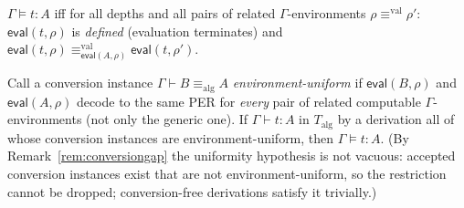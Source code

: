 \documentclass{lmcs}
\newcommand{\aconv}{\equiv_{\mathrm{alg}}}
\newcommand{\valeq}{\equiv^{\mathrm{val}}}
\newcommand{\evalop}{\mathsf{eval}}
\begin{document}
\begin{defi}\label{def:semtyping}
  $\Gamma \vDash t : A$ iff for all depths and all pairs of related
  $\Gamma$-environments $\rho \valeq \rho'$: $\evalop(t, \rho)$ is
  \emph{defined} (evaluation terminates) and
  $\evalop(t, \rho) \valeq_{\evalop(A,\rho)} \evalop(t, \rho')$.
\end{defi}

\begin{thm}
  \label{thm:fundamental}
  Call a conversion instance $\Gamma \vdash B \aconv A$
  \emph{environment-uniform} if $\evalop(B,\rho)$ and
  $\evalop(A,\rho)$ decode to the same PER for \emph{every} pair of
  related computable $\Gamma$-environments (not only the generic
  one).  If $\Gamma \vdash t : A$ in $T_{\mathrm{alg}}$ by a
  derivation all of whose conversion instances are
  environment-uniform, then $\Gamma \vDash t : A$.
  (By Remark~\ref{rem:conversiongap} the uniformity hypothesis is
  not vacuous: accepted conversion instances exist that are not
  environment-uniform, so the restriction cannot be dropped;
  conversion-free derivations satisfy it trivially.)
\end{thm}
\end{document}
